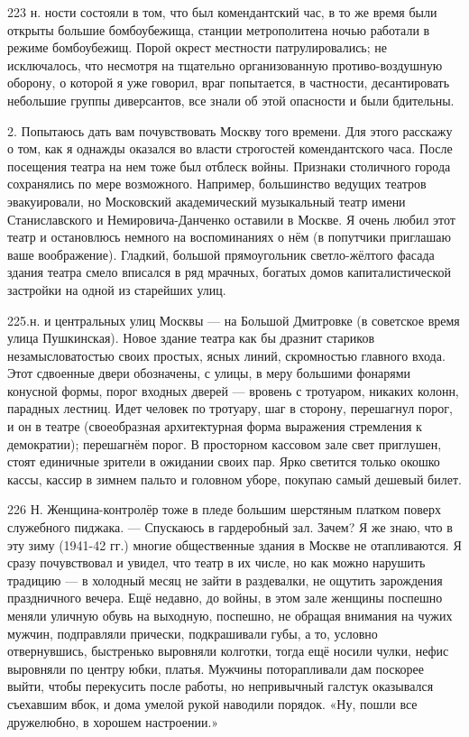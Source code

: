 223 н.
ности состояли в том, что был комендантский час, в то же время были открыты большие бомбоубежища, станции метрополитена ночью работали в режиме бомбоубежищ. Порой окрест местности патрулировались; не исключалось, что несмотря на тщательно организованную противо-воздушную оборону, о которой я уже говорил, враг попытается, в частности, десантировать небольшие группы диверсантов, все знали об этой опасности и были бдительны.

2. Попытаюсь дать вам почувствовать Москву того времени. Для этого расскажу о том, как я однажды оказался во власти строгостей комендантского часа. После посещения театра на нем тоже был отблеск войны. Признаки столичного города сохранялись по мере возможного. Например, большинство ведущих театров эвакуировали, но Московский академический музыкальный театр имени Станиславского и Немировича-Данченко оставили в Москве. Я очень любил этот театр и остановлюсь немного на воспоминаниях о нём (в попутчики приглашаю ваше воображение). Гладкий, большой прямоугольник светло-жёлтого фасада здания театра смело вписался в ряд мрачных, богатых домов капиталистической застройки на одной из старейших улиц.

225.н. и центральных улиц Москвы — на Большой Дмитровке (в советское время улица Пушкинская). Новое здание театра как бы дразнит стариков незамысловатостью своих простых, ясных линий, скромностью главного входа. Этот сдвоенные двери обозначены, с улицы, в меру большими фонарями конусной формы, порог входных дверей — вровень с тротуаром, никаких колонн, парадных лестниц. Идет человек по тротуару, шаг в сторону, перешагнул порог, и он в театре (своеобразная архитектурная форма выражения стремления к демократии); перешагнём порог. В просторном кассовом зале свет приглушен, стоят единичные зрители в ожидании своих пар. Ярко светится только окошко кассы, кассир в зимнем пальто и головном уборе, покупаю самый дешевый билет.

226 Н. Женщина-контролёр тоже в пледе большим шерстяным платком поверх служебного пиджака. — Спускаюсь в гардеробный зал. Зачем? Я же знаю, что в эту зиму (1941-42 гг.) многие общественные здания в Москве не отапливаются. Я сразу почувствовал и увидел, что театр в их числе, но как можно нарушить традицию — в холодный месяц не зайти в раздевалки, не ощутить зарождения праздничного вечера. Ещё недавно, до войны, в этом зале женщины поспешно меняли уличную обувь на выходную, поспешно, не обращая внимания на чужих мужчин, подправляли прически, подкрашивали губы, а то, условно отвернувшись, быстренько выровняли колготки, тогда ещё носили чулки, нефис выровняли по центру юбки, платья. Мужчины поторапливали дам поскорее выйти, чтобы перекусить после работы, но непривычный галстук оказывался съехавшим вбок, и дома умелой рукой наводили порядок. «Ну, пошли все дружелюбно, в хорошем настроении.»


